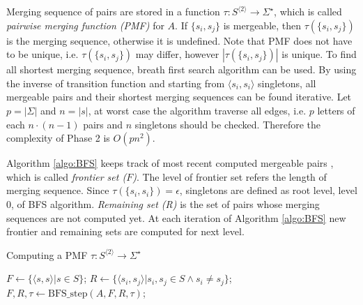 \documentclass[12pt]{article}
\begin{document}
Merging sequence of pairs are stored in a function $\tau : S^{\langle 2 \rangle} \rightarrow \Sigma^\star$, which is called \textit{pairwise merging function (PMF)} for $A$. If $\{ s_i, s_j \}$ is mergeable, then $\tau(\{ s_i, s_j \})$ is the merging sequence, otherwise it is undefined. Note that PMF does not have to be unique, i.e. $\tau(\{ s_i, s_j \})$ may differ, however  $|\tau(\{ s_i, s_j \})|$ is unique. To find all shortest merging sequence, breath first search algorithm can be used. By using the inverse of transition function and starting from $\langle s_i, s_i \rangle$ singletons, all mergeable pairs and their shortest merging sequences can be found iterative. Let $p=|\Sigma|$ and $n=|s|$, at worst case the algorithm traverse all edges, i.e. $p$ letters of each $n\cdot(n-1)$ pairs and $n$ singletons should be checked. Therefore the complexity of Phase 2 is $O(pn^2)$. 

Algorithm \ref{algo:BFS} keeps track of most recent computed mergeable pairs , which is called \textit{frontier set ($F$)}. The level of frontier set refers the length of merging sequence. Since $\tau(\{ s_i, s_i \})=\epsilon$, singletons are defined as root level, level 0, of BFS algorithm. \textit{Remaining set (R)} is the set of pairs whose merging sequences are not computed yet. At each iteration of Algorithm \ref{algo:BFS} new frontier and remaining sets are computed for next level. 


\begin{algorithm}[ht]
	\label{algo:BFS}
	\caption{Computing a PMF $\tau : S^{\langle 2 \rangle} \rightarrow \Sigma^\star$}
	
	
	$F \longleftarrow \{ \langle s,s\rangle | s \in S \}$; 
    $R \longleftarrow \{ \langle s_i,s_j\rangle | s_i,s_j \in S \wedge s_i \neq s_j \}$; 
	{
		$F,R,\tau \longleftarrow \mbox{BFS\_step}(A,F,R,\tau)$;\\
	}
\end{algorithm}
\end{document}
